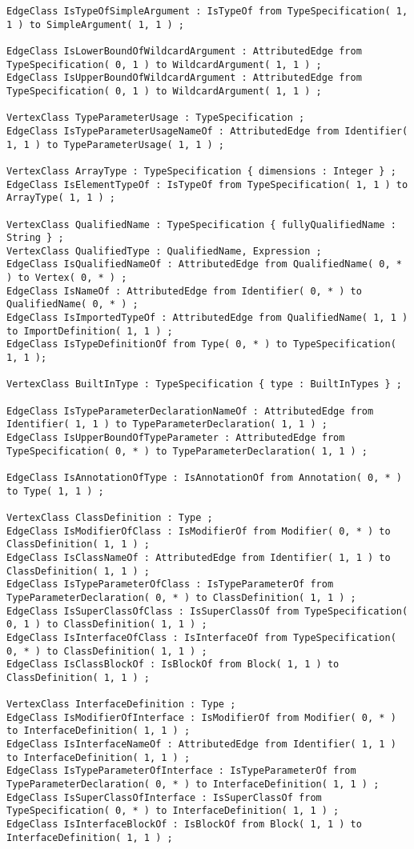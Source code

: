 \begin{lstlisting}[caption=Das im Javaextraktor eingesetzte Schema, label=schema_complete, captionpos=b, style=tgschema]
EdgeClass IsTypeOfSimpleArgument : IsTypeOf from TypeSpecification( 1, 1 ) to SimpleArgument( 1, 1 ) ;

EdgeClass IsLowerBoundOfWildcardArgument : AttributedEdge from TypeSpecification( 0, 1 ) to WildcardArgument( 1, 1 ) ;
EdgeClass IsUpperBoundOfWildcardArgument : AttributedEdge from TypeSpecification( 0, 1 ) to WildcardArgument( 1, 1 ) ;

VertexClass TypeParameterUsage : TypeSpecification ;
EdgeClass IsTypeParameterUsageNameOf : AttributedEdge from Identifier( 1, 1 ) to TypeParameterUsage( 1, 1 ) ;

VertexClass ArrayType : TypeSpecification { dimensions : Integer } ;
EdgeClass IsElementTypeOf : IsTypeOf from TypeSpecification( 1, 1 ) to ArrayType( 1, 1 ) ;

VertexClass QualifiedName : TypeSpecification { fullyQualifiedName : String } ;
VertexClass QualifiedType : QualifiedName, Expression ;
EdgeClass IsQualifiedNameOf : AttributedEdge from QualifiedName( 0, * ) to Vertex( 0, * ) ;
EdgeClass IsNameOf : AttributedEdge from Identifier( 0, * ) to QualifiedName( 0, * ) ;
EdgeClass IsImportedTypeOf : AttributedEdge from QualifiedName( 1, 1 ) to ImportDefinition( 1, 1 ) ;
EdgeClass IsTypeDefinitionOf from Type( 0, * ) to TypeSpecification( 1, 1 );

VertexClass BuiltInType : TypeSpecification { type : BuiltInTypes } ;

EdgeClass IsTypeParameterDeclarationNameOf : AttributedEdge from Identifier( 1, 1 ) to TypeParameterDeclaration( 1, 1 ) ;
EdgeClass IsUpperBoundOfTypeParameter : AttributedEdge from TypeSpecification( 0, * ) to TypeParameterDeclaration( 1, 1 ) ;

EdgeClass IsAnnotationOfType : IsAnnotationOf from Annotation( 0, * ) to Type( 1, 1 ) ;

VertexClass ClassDefinition : Type ;
EdgeClass IsModifierOfClass : IsModifierOf from Modifier( 0, * ) to ClassDefinition( 1, 1 ) ;
EdgeClass IsClassNameOf : AttributedEdge from Identifier( 1, 1 ) to ClassDefinition( 1, 1 ) ;
EdgeClass IsTypeParameterOfClass : IsTypeParameterOf from TypeParameterDeclaration( 0, * ) to ClassDefinition( 1, 1 ) ;
EdgeClass IsSuperClassOfClass : IsSuperClassOf from TypeSpecification( 0, 1 ) to ClassDefinition( 1, 1 ) ;
EdgeClass IsInterfaceOfClass : IsInterfaceOf from TypeSpecification( 0, * ) to ClassDefinition( 1, 1 ) ;
EdgeClass IsClassBlockOf : IsBlockOf from Block( 1, 1 ) to ClassDefinition( 1, 1 ) ;

VertexClass InterfaceDefinition : Type ;
EdgeClass IsModifierOfInterface : IsModifierOf from Modifier( 0, * ) to InterfaceDefinition( 1, 1 ) ;
EdgeClass IsInterfaceNameOf : AttributedEdge from Identifier( 1, 1 ) to InterfaceDefinition( 1, 1 ) ;
EdgeClass IsTypeParameterOfInterface : IsTypeParameterOf from TypeParameterDeclaration( 0, * ) to InterfaceDefinition( 1, 1 ) ;
EdgeClass IsSuperClassOfInterface : IsSuperClassOf from TypeSpecification( 0, * ) to InterfaceDefinition( 1, 1 ) ;
EdgeClass IsInterfaceBlockOf : IsBlockOf from Block( 1, 1 ) to InterfaceDefinition( 1, 1 ) ;



\end{lstlisting}
